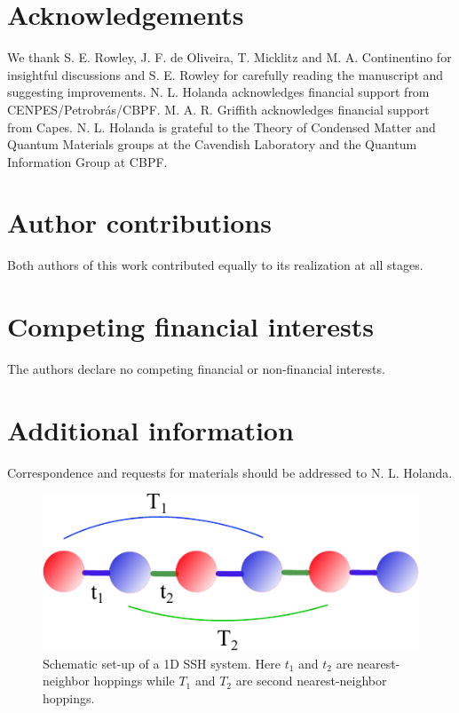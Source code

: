 \documentclass[fleqn,10pt]{wlscirep}
\begin{document}
\section*{Acknowledgements}

We thank S. E. Rowley, J. F. de Oliveira, T. Micklitz and M. A. Continentino for insightful discussions and S. E. Rowley for carefully reading the manuscript and suggesting improvements. N. L. Holanda acknowledges financial support from CENPES/Petrobr\'as/CBPF. M. A. R. Griffith acknowledges financial support from Capes. N. L. Holanda is grateful to the Theory of Condensed Matter and Quantum Materials groups at the Cavendish Laboratory and the Quantum Information Group at CBPF.


\section*{Author contributions}

Both authors of this work contributed equally to its realization at all stages.

\section*{Competing financial interests}

The authors declare no competing financial or non-financial interests.

\section*{Additional information}

Correspondence and requests for materials should be addressed to N. L. Holanda.




\newpage

\begin{figure}
  \centering
  \includegraphics[width=.37\textwidth]{model.pdf}
  \caption{Schematic set-up of a 1D SSH system. Here $t_1$ and $t_2$ are nearest-neighbor hoppings while $T_1$ and $T_2$ are second nearest-neighbor hoppings.}
\label{fig:model}
\end{figure}
\end{document}
